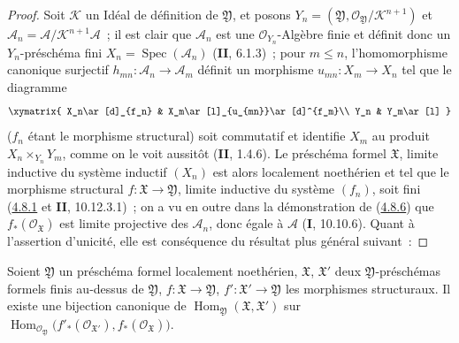 \begin{proof}
Soit $\mathcal K$ un Idéal de définition de $\mathfrak Y$, et posons
$Y_n=(\mathfrak Y,\mathcal O_{\mathfrak Y}/\mathcal K^{n+1})$ et
$\mathcal A_n=\mathcal A/\mathcal K^{n+1}\mathcal A$~;
il est clair que $\mathcal A_n$ est une $\mathcal O_{Y_n}$-Algèbre finie et
définit donc un
$Y_n$-préschéma fini $X_n=\operatorname{Spec}(\mathcal A_n)$ (\textbf{II}, 6.1.3)~;
pour $m\leq n$, l'homomorphisme canonique surjectif
$h_{mn}:\mathcal A_n\to\mathcal A_m$ définit un morphisme
$u_{mn}:X_m\to X_n$ tel que le diagramme
\[
\xymatrix{
X_n\ar[d]_{f_n} & X_m\ar[l]_{u_{mn}}\ar[d]^{f_m}\\
Y_n & Y_m\ar[l]
}
\]
($f_n$ étant le morphisme structural) soit commutatif et identifie $X_m$ au
produit $X_n\times_{Y_n}Y_m$, comme on le voit aussitôt (\textbf{II}, 1.4.6). Le
préschéma formel $\mathfrak X$, limite inductive du système inductif $(X_n)$
est alors localement noethérien et tel que le morphisme structural
$f:\mathfrak X\to\mathfrak Y$, limite inductive du système $(f_n)$, soit fini
(\hyperref[III.4.8.1-fr]{4.8.1} et \textbf{II}, 10.12.3.1)~; on a vu en outre dans la
démonstration de (\hyperref[III.4.8.6-fr]{4.8.6}) que
$f_*(\mathcal O_{\mathfrak X})$ est limite projective des $\mathcal A_n$, donc
égale à $\mathcal A$ (\textbf{I}, 10.10.6). Quant à l'assertion d'unicité, elle est
conséquence du résultat plus général suivant~:
\end{proof}

\begin{proposition}[4.8.8]
\label{III.4.8.8-fr}
Soient $\mathfrak Y$ un préschéma formel localement noethérien,
$\mathfrak X$, $\mathfrak X'$ deux $\mathfrak Y$-préschémas formels finis
au-dessus de $\mathfrak Y$, $f:\mathfrak X\to\mathfrak Y$,
$f':\mathfrak X'\to\mathfrak Y$ les morphismes structuraux. Il existe une
bijection canonique de
$\operatorname{Hom}_{\mathfrak Y}(\mathfrak X,\mathfrak X')$
sur
$\operatorname{Hom}_{\mathcal O_{\mathfrak Y}}
\bigl(f'_*(\mathcal O_{\mathfrak X'}),f_*(\mathcal O_{\mathfrak X})\bigr)$\footnotemark.
\end{proposition}

